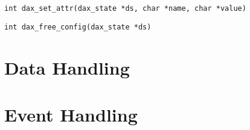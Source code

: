 \begin{verbatim}
int dax_set_attr(dax_state *ds, char *name, char *value)
\end{verbatim}

\begin{verbatim}
int dax_free_config(dax_state *ds)
\end{verbatim}

\section{Data Handling}

\section{Event Handling}
